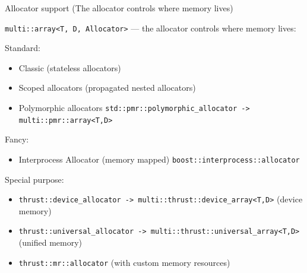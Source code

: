 \begin{frame}[fragile]{Allocator support (The allocator controls where memory lives)}

\lstinline|multi::array<T, D, Allocator>| --- the allocator controls where memory lives:

Standard:
\begin{itemize}
  \item Classic (stateless allocators)
  \item Scoped allocators (propagated nested allocators)
  \item Polymorphic allocators \lstinline|std::pmr::polymorphic_allocator -> multi::pmr::array<T,D>|
\end{itemize}

Fancy:
\begin{itemize}
  \item Interprocess Allocator (memory mapped) \lstinline|boost::interprocess::allocator|
\end{itemize}

Special purpose:
\begin{itemize}
  \item \lstinline|thrust::device_allocator -> multi::thrust::device_array<T,D>| (device memory)
  \item \lstinline|thrust::universal_allocator -> multi::thrust::universal_array<T,D>| (unified memory)
  \item \lstinline|thrust::mr::allocator| (with custom memory resources)
\end{itemize}
\end{frame}

